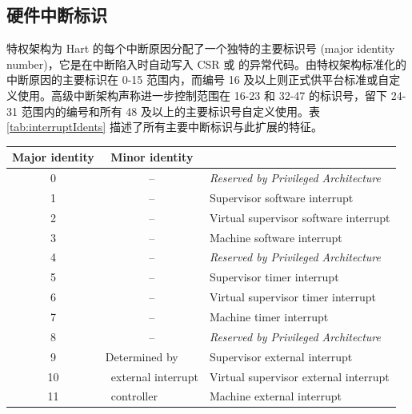\begin{translation}
\subsection{硬件中断标识}

{\RISCV} 特权架构为 Hart 的每个中断原因分配了一个独特的主要标识号 (major identity number)，它是在中断陷入时自动写入 CSR  或  的异常代码。由特权架构标准化的中断原因的主要标识在 0-15 范围内，而编号 16 及以上则正式供平台标准或自定义使用。高级中断架构声称进一步控制范围在 16-23 和 32-47 的标识号，留下 24-31 范围内的编号和所有 48 及以上的主要标识号自定义使用。表 \ref{tab:interruptIdents} 描述了所有主要中断标识与此扩展的特征。

\begin{table}[h!]
    \begin{center}
    \begin{tabular}{|c|c|l|}
    \hline
    Major identity & Minor identity & \\
    \hline
    \hline
    0              & --             & \em Reserved by Privileged Architecture \\
    \hline
    1              & --             & Supervisor software interrupt \\
    2              & --             & Virtual supervisor software interrupt \\
    3              & --             & Machine software interrupt \\
    \hline
    4              & --             & \em Reserved by Privileged Architecture \\
    \hline
    5              & --             & Supervisor timer interrupt \\
    6              & --             & Virtual supervisor timer interrupt \\
    7              & --             & Machine timer interrupt \\
    \hline
    8              & --             & \em Reserved by Privileged Architecture \\
    \hline
    9              & \multicolumn{1}{l|}{Determined by}
                                    & Supervisor external interrupt \\
    10             & \multicolumn{1}{l|}{\ external interrupt}
                                    & Virtual supervisor external interrupt \\
    11             & \multicolumn{1}{l|}{\ controller}
                                    & Machine external interrupt \\

\end{tabular}
\end{center}
\end{table}
\end{translation}
